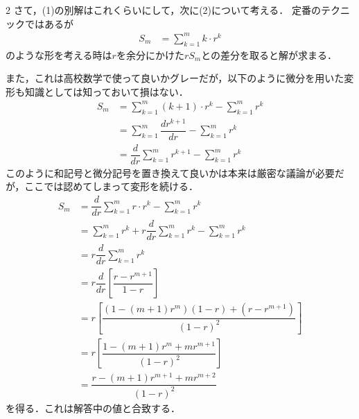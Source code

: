 \documentclass[../../main.tex]{subfiles}
\begin{document}
\begin{multicols}{2}
  さて，(1)の別解はこれくらいにして，次に(2)について考える．
  定番のテクニックではあるが
  \begin{align}
    S_m & = \sum_{k=1}^m k \cdot r^k
  \end{align}
  のような形を考える時は$r$を余分にかけた$rS_m$との差分を取ると解が求まる．

  また，これは高校数学で使って良いかグレーだが，以下のように微分を用いた変形も知識としては知っておいて損はない．
  \begin{align}
    S_m & = \sum_{k=1}^m (k+1) \cdot r^k - \sum_{k=1}^m r^k      \\
    & = \sum_{k=1}^m \dfrac{d r^{k+1}}{dr} - \sum_{k=1}^m r^k \\
    & = \dfrac{d}{dr}\sum_{k=1}^m r^{k+1} - \sum_{k=1}^m r^k
  \end{align}
  このように和記号と微分記号を置き換えて良いかは本来は厳密な議論が必要だが，ここでは認めてしまって変形を続ける．
  \begin{align}
    S_m
    & = \dfrac{d}{dr}\sum_{k=1}^m r\cdot r^{k} - \sum_{k=1}^m r^k                \\
    & = \sum_{k=1}^m r^{k} + r\dfrac{d}{dr}\sum_{k=1}^m r^{k} - \sum_{k=1}^m r^k \\
    & = r\dfrac{d}{dr}\sum_{k=1}^m r^{k}                                         \\
    & = r\dfrac{d}{dr}\left[\dfrac{r-r^{m+1}}{1-r}\right]                         \\
    & = r\left[\dfrac{(1-(m+1)r^{m})(1-r) + (r-r^{m+1})}{(1-r)^2}\right]         \\
    & = r\left[\dfrac{1-(m+1)r^{m}+mr^{m+1}}{(1-r)^2}\right]                     \\
    & = \dfrac{r-(m+1)r^{m+1}+mr^{m+2}}{(1-r)^2}
  \end{align}
  を得る．これは解答中の値と合致する．

  \newpage
\end{multicols}
\end{document}
